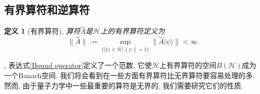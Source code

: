 \documentclass[a4paper,11pt]{book}
\newtheorem{definition}{\hspace{2em}定义}[section]
\begin{document}
\subsection{有界算符和逆算符}
\begin{definition}[有界算符]
  算符$\hat{A}$是$\mathcal{H}$上的有界算符定义为
\begin{equation}\label{Bound operator}
  \|\hat{A}\|:=\sup_{\{|\psi\rangle\in\mathcal{H}|\|\psi\|=1\}}\|\hat{A}|\psi\rangle\|<\infty
\end{equation}
\end{definition}
, 表达式\ref{Bound operator}定义了一个范数, 它使$\mathcal{H}$上有界算符的空间$B(\mathcal{H})$成为一个Banach空间. 我们将会看到在一些方面有界算符比无界算符要容易处理的多. 然而, 由于量子力学中一些最重要的算符是无界的, 我们需要研究它们的性质.
\end{document}

